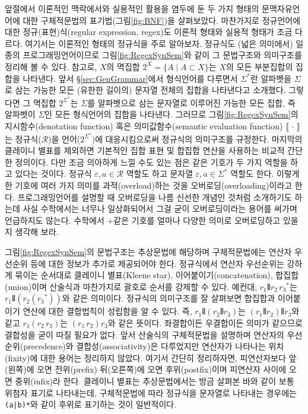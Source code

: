 앞절에서 이론적인 맥락에서와 실용적인 활용을 염두에 둔 두 가지 형태의
문맥자유언어에 대한 구체적문법의 표기법(그림\;\ref{fig:BNF})을 살펴보았다.
마찬가지로 정규언어에 대한 정규(표현)식(regular expression, regex)도
이론적 형태와 실용적 형태가 조금 다르다. 여기서는 이론적인 형태의
정규식을 주로 알아보자. 정규식도 (넓은 의미에서) 일종의 프로그래밍언어이므로
그림\;\ref{fig:RegexSynSem}와 같이 그 문법구조와 의미구조를 정리해 볼 수 있다.
참고로, $X$의 멱집합 $2^X = \{A\mid A\subset X\}$는 $X$의 모든 부분집합의
집합을 나타낸다. 앞서 \S\ref{sec:GenGrammar}에서 형식언어를 다루면서
$\Sigma^{*}$란 알파벳을 $\Sigma$로 삼는 가능한 모든 (유한한 길이의)
문자열 전체의 집합을 나타낸다고 소개했다. 그렇다면 그 멱집합
$2^{\Sigma^{*}}$는 $\Sigma$를 알파벳으로 삼는 문자열로 이루어진
가능한 모든 집합, 즉 알파벳이 $\Sigma$인 모든 형식언어의 집합을 나타낸다.
그러므로 그림\;\ref{fig:RegexSynSem}의 지시함수(denotation function) 혹은
의미값함수(semantic evaluation function) $\llbracket\,\cdot\,\rrbracket$는
정규식($\mathcal{R}$)을 언어($2^{\Sigma^{*}}$)에 대응시킴으로써 정규식의
의미구조를 규정한다. 마지막의 클레이니 별표를 제외하면 기본적인 집합 표현
및 합집합 연산을 사용하는 비교적 간단한 정의이다. 다만 조금 의아하게 느낄
수도 있는 점은 같은 기호가 두 가지 역할을 하고 있다는 것이다.
정규식 $\varepsilon,a\in\mathcal{R}$ 역할도 하고
문자열 $\varepsilon,a\in\Sigma^{*}$ 역할도 한다.
이렇게 한 기호에 여러 가지 의미를 과적(overload)하는 것을
오버로딩(overloading)이라고 한다. 프로그래밍언어를 설명할
때 오버로딩을 나름 신선한 개념인 것처럼 소개하기도 하는데
사실 수학에서는 너무나 일상화되어서 그걸 굳이 오버로딩이라는
용어를 써가며 언급하지도 않는다. 수학에서 $+$같은 기호를 얼마나
다양한 의미로 오버로딩하고 있을지 생각해 보라.

그림\;\ref{fig:RegexSynSem}의 문법구조는 추상문법에 해당하며
구체적문법에는 연산자 우선순위 등에 대한 정보가 추가로 제공되어야 한다.
정규식에서 연산자 우선순위는 강하게 묶이는 순서대로
클레이니 별표(Kleene star), 이어붙이기(concatenation), 합집합(union)이며
산술식과 마찬가지로 괄호로 순서를 강제할 수 있다. 예컨대,
$r_1\VERT r_2\,{r_3}^{*}$는 $r_1\VERT(r_2({r_3}^{*}))$와 같은 의미이다.
정규식의 의미구조를 잘 살펴보면 합집합과 이어붙이기 연산에 대한
결합법칙이 성립함을 알 수 있다.
즉, $r_1\VERT(r_2\VERT r_3)$는 $(r_1\VERT r_2)\VERT r_3$와
같고 $r_1(r_2\,r_3)$는 $(r_1\,r_2)r_3$와 같은 뜻이다.
좌결합이든 우결합이든 의미가 같으므로 결합성을 굳이 따질 필요가 없다.
앞서 산술식의 구체적문법을 설명하며 연산자의 우선순위(precedence)와
결합성(associativity)은 다루었지만 연산자가 나타나는 위치(fixity)에
대한 용어는 정리하지 않았다. 여기서 간단히 정리하자면, 피연산자보다
앞(왼쪽)에 오면 전위(prefix) 뒤(오른쪽)에 오면 후위(postfix)이며
피연산자 사이에 오면 중위(infix)라 한다. 클레이니 별표는 추상문법에서는
방금 살펴본 바와 같이 보통 위첨자 표기로 나타내는데, 구체적문법에 따라
정규식을 문자열로 나타내는 경우에는 \verb/(a|b)*/와 같이 후위로
표기하는 것이 일반적이다.

